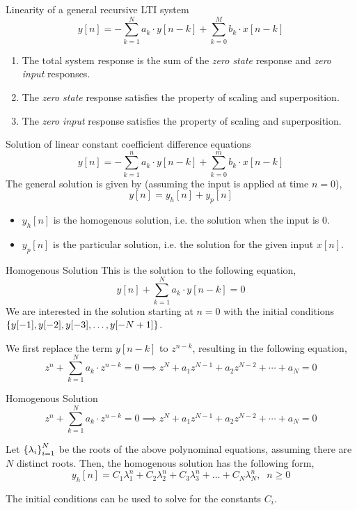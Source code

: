 \documentclass[aspectratio=169]{beamer}
\let\olditem\item
\renewcommand{\item}{\setlength{\itemsep}{\fill}\olditem}
\def\lc{\ensuremath\left\{}
\def\rc{\ensuremath\right\}}
\begin{document}
\begin{frame}[t]{Linearity of a general recursive LTI system}
\[ y[n] = -\sum_{k=1}^N a_k \cdot y[n - k] + \sum_{k=0}^{M} b_k \cdot x[n-k] \]
\begin{enumerate}
  \item The total system response is the sum of the \textit{zero state} response and \textit{zero input} responses.
  \item The \textit{zero state} response satisfies the property of scaling and superposition.
  \item The \textit{zero input} response satisfies the property of scaling and superposition.
\end{enumerate}
\end{frame}

\begin{frame}[t]{Solution of linear constant coefficient difference equations}
\[ y[n] = -\sum_{k=1}^n a_k \cdot y[n - k] + \sum_{k=0}^{m} b_k \cdot x[n-k] \]
The general solution is given by (assuming the input is applied at time $n = 0$),
\[ y[n] = y_{h}[n] + y_p[n] \]
\begin{itemize}
  \item  $y_h[n]$ is the homogenous solution, i.e. the solution when the input is $0$.
  \item  $y_p[n]$ is the particular solution, i.e. the solution for the given input $x[n]$.
\end{itemize}
\end{frame}

\begin{frame}[t]{Homogenous Solution}
This is the solution to the following equation,
\[ y[n] + \sum_{k=1}^N a_k \cdot y[n - k] = 0\]
We are interested in the solution starting at $n=0$ with the initial conditions $\lc y[-1], y[-2], y[-3], \ldots, y[-N+1]\rc$.

\vspace{0.5cm} 

We first replace the term $y[n-k]$ to $z^{n-k}$, resulting in the following equation,
\[ z^n + \sum_{k=1}^N a_k \cdot z^{n - k} = 0 \implies z^N + a_1z^{N-1} + a_2z^{N-2} + \cdots + a_N = 0 \] 
\end{frame}

\begin{frame}[t]{Homogenous Solution}
\[ z^n + \sum_{k=1}^N a_k \cdot z^{n - k} = 0 \implies z^N + a_1z^{N-1} + a_2z^{N-2} + \cdots + a_N = 0 \]

Let $\lc \lambda_i \rc_{i=1}^N$ be the roots of the above polynominal equations, assuming there are $N$ distinct roots. Then, the homogenous solution has the following form,
\[ y_h[n] = C_1 \lambda_1^n + C_2 \lambda_2^n + C_3 \lambda_3^n + \ldots + C_N \lambda_N^n , \,\,\ n \geq 0 \]

The initial conditions can be used to solve for the constants $C_i$.
\end{frame}
\end{document}
